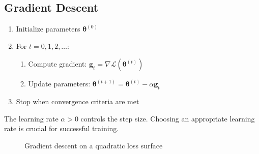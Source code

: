 \subsection{Gradient Descent}

\begin{algorithm}
\begin{enumerate}
    \item Initialize parameters $\mathbf{\theta}^{(0)}$
    \item For $t = 0, 1, 2, \ldots$:
    \begin{enumerate}
        \item Compute gradient: $\mathbf{g}_t = \nabla \mathcal{L}(\mathbf{\theta}^{(t)})$
        \item Update parameters: $\mathbf{\theta}^{(t+1)} = \mathbf{\theta}^{(t)} - \alpha \mathbf{g}_t$
    \end{enumerate}
    \item Stop when convergence criteria are met
\end{enumerate}
\end{algorithm}

The learning rate $\alpha > 0$ controls the step size. Choosing an appropriate learning rate is crucial for successful training.

\begin{figure}[h]
    \centering
    \caption{Gradient descent on a quadratic loss surface}
    \label{fig:gd_quadratic}
\end{figure}

